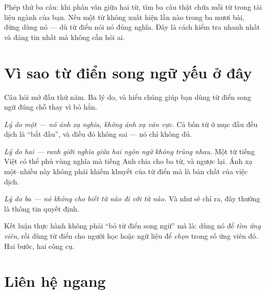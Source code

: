 \documentclass[../../english.tex]{subfiles}
\begin{document}
\begin{cannho}
Phép thử ba câu: khi phân vân giữa hai từ, tìm ba câu thật chứa mỗi từ trong tài liệu ngành của bạn. Nếu một từ không xuất hiện lần nào trong ba mươi bài, đừng dùng nó --- dù từ điển nói nó đúng nghĩa. Đây là cách kiểm tra nhanh nhất và đáng tin nhất mà không cần hỏi ai.
\end{cannho}

\section{Vì sao từ điển song ngữ yếu ở đây}

Câu hỏi mở đầu thứ năm. Ba lý do, và hiểu chúng giúp bạn dùng từ điển song ngữ đúng chỗ thay vì bỏ hẳn.

\emph{Lý do một --- nó ánh xạ nghĩa, không ánh xạ văn vực.} Cả bốn từ ở mục đầu đều dịch là ``bắt đầu'', và điều đó không sai --- nó chỉ không đủ.

\emph{Lý do hai --- ranh giới nghĩa giữa hai ngôn ngữ không trùng nhau.} Một từ tiếng Việt có thể phủ vùng nghĩa mà tiếng Anh chia cho ba từ, và ngược lại. Ánh xạ một--nhiều này không phải khiếm khuyết của từ điển mà là bản chất của việc dịch.

\emph{Lý do ba --- nó không cho biết từ nào đi với từ nào.} Và như  sẽ chỉ ra, đây thường là thông tin quyết định.

Kết luận thực hành không phải ``bỏ từ điển song ngữ'' mà là: dùng nó để \emph{tìm ứng viên}, rồi dùng từ điển cho người học hoặc ngữ liệu để \emph{chọn} trong số ứng viên đó. Hai bước, hai công cụ.

\section{Liên hệ ngang}

\begin{lienhe}
\end{lienhe}
\end{document}
